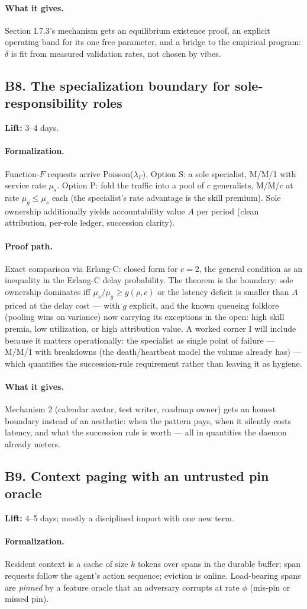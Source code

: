 \documentclass[11pt,a4paper]{article}
\newcommand{\lift}[1]{\noindent\textbf{Lift:} #1.}
\newcommand{\gives}{\paragraph{What it gives.}}
\newcommand{\form}{\paragraph{Formalization.}}
\newcommand{\proofpath}{\paragraph{Proof path.}}
\begin{document}
\gives Section I.7.3's mechanism gets an equilibrium existence proof, an explicit operating band for its one free parameter, and a bridge to the empirical program: $\delta$ is fit from measured validation rates, not chosen by vibes.

\subsection{B8. The specialization boundary for sole-responsibility roles}
\lift{3--4 days}

\form Function-$F$ requests arrive Poisson($\lambda_F$). Option S: a sole specialist, M/M/1 with service rate $\mu_s$. Option P: fold the traffic into a pool of $c$ generalists, M/M/$c$ at rate $\mu_g \le \mu_s$ each (the specialist's rate advantage is the skill premium). Sole ownership additionally yields accountability value $A$ per period (clean attribution, per-role ledger, succession clarity).

\proofpath Exact comparison via Erlang-C: closed form for $c=2$, the general condition as an inequality in the Erlang-C delay probability. The theorem is the boundary: sole ownership dominates iff $\mu_s/\mu_g \ge g(\rho, c)$ or the latency deficit is smaller than $A$ priced at the delay cost --- with $g$ explicit, and the known queueing folklore (pooling wins on variance) now carrying its exceptions in the open: high skill premia, low utilization, or high attribution value. A worked corner I will include because it matters operationally: the specialist as single point of failure --- M/M/1 with breakdowns (the death/heartbeat model the volume already has) --- which quantifies the succession-rule requirement rather than leaving it as hygiene.

\gives Mechanism 2 (calendar avatar, test writer, roadmap owner) gets an honest boundary instead of an aesthetic: when the pattern pays, when it silently costs latency, and what the succession rule is worth --- all in quantities the daemon already meters.

\subsection{B9. Context paging with an untrusted pin oracle}
\lift{4--5 days; mostly a disciplined import with one new term}

\form Resident context is a cache of size $k$ tokens over spans in the durable buffer; span requests follow the agent's action sequence; eviction is online. Load-bearing spans are \emph{pinned} by a feature oracle that an adversary corrupts at rate $\phi$ (mis-pin or missed pin).
\end{document}
